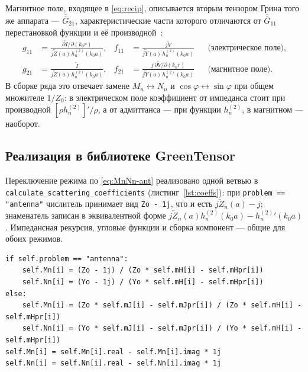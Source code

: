 \documentclass[11pt,a4paper]{article}
\newcommand{\Zl}{\overleftarrow{Z}}
\newcommand{\Zb}{\overleftrightarrow{Z}}
\newcommand{\Yb}{\overleftrightarrow{Y}}
\newcommand{\hn}{h_n^{(2)}}
\begin{document}
Магнитное поле, входящее в \eqref{eq:recip}, описывается вторым тензором Грина того
же аппарата --- $\overline{\overline{G}}_{21}$, характеристические части которого
отличаются от $\overline{\overline{G}}_{11}$ перестановкой функции и её
производной~\cite{denisov2016tensors}:
%
\begin{equation}
  \label{eq:g21}
  \begin{aligned}
    g_{11} &= \frac{\partial\overleftarrow I/\partial(k_0r)}{j\Zb(a)\,\hn(k_0a)}, &
    f_{11} &= \frac{j\overleftarrow V}{j\Yb(a)\,\hn(k_0a)}
    &&\text{(электрическое поле)},\\
    g_{21} &= \frac{\overleftarrow I}{j\Zb(a)\,\hn(k_0a)}, &
    f_{21} &= \frac{j\,\partial\overleftarrow V/\partial(k_0r)}{j\Yb(a)\,\hn(k_0a)}
    &&\text{(магнитное поле)}.
  \end{aligned}
\end{equation}
%
В сборке ряда это отвечает замене $M_n\leftrightarrow N_n$ и
$\cos\varphi\leftrightarrow\sin\varphi$ при общем множителе $1/Z_0$: в
электрическом поле коэффициент от импеданса стоит при производной
$[\rho\hn]'/\rho$, а от адмиттанса --- при функции $\hn$, в магнитном --- наоборот.

\subsection{Реализация в библиотеке GreenTensor}
\label{sec:impl-ant}

Переключение режима по \eqref{eq:MnNn-ant} реализовано одной ветвью в
\texttt{calculate\_scattering\_coefficients} (листинг~\ref{lst:coeffs}): при
\texttt{problem == "antenna"} числитель принимает вид \texttt{Zo - 1j}, что и есть
$j\Zl_n(a) - j$; знаменатель записан в эквивалентной форме
$j\Zl_n(a)\hn(k_0a) - \hn{}'(k_0a)$. Импедансная рекурсия, угловые функции и
сборка компонент --- общие для обоих режимов.

\begin{lstlisting}[style=py,caption={\texttt{green\_tensor/01\_sphere.py::calculate\_scattering\_coefficients}
--- переключение режима возбуждения},label={lst:coeffs}]
if self.problem == "antenna":
    self.Mn[i] = (Zo - 1j) / (Zo * self.mH[i] - self.mHpr[i])
    self.Nn[i] = (Yo - 1j) / (Yo * self.mH[i] - self.mHpr[i])
else:
    self.Mn[i] = (Zo * self.mJ[i] - self.mJpr[i]) / (Zo * self.mH[i] - self.mHpr[i])
    self.Nn[i] = (Yo * self.mJ[i] - self.mJpr[i]) / (Yo * self.mH[i] - self.mHpr[i])
self.Mn[i] = self.Mn[i].real - self.Mn[i].imag * 1j
self.Nn[i] = self.Nn[i].real - self.Nn[i].imag * 1j
\end{lstlisting}
\end{document}
